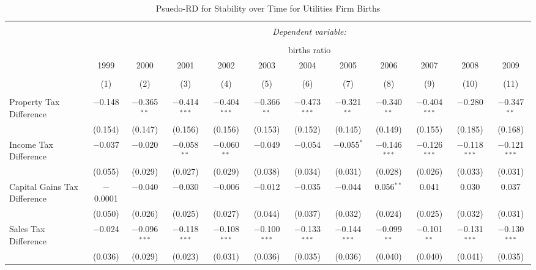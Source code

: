 
\begin{table}[!htbp] \centering 
  \caption{Psuedo-RD for Stability over Time for  Utilities Firm Births} 
  \label{} 
\begin{tabular}{@{\extracolsep{5pt}}lccccccccccc} 
\\[-1.8ex]\hline 
\hline \\[-1.8ex] 
 & \multicolumn{11}{c}{\textit{Dependent variable:}} \\ 
\cline{2-12} 
\\[-1.8ex] & \multicolumn{11}{c}{births ratio} \\ 
 & 1999 & 2000 & 2001 & 2002 & 2003 & 2004 & 2005 & 2006 & 2007 & 2008 & 2009 \\ 
\\[-1.8ex] & (1) & (2) & (3) & (4) & (5) & (6) & (7) & (8) & (9) & (10) & (11)\\ 
\hline \\[-1.8ex] 
 Property Tax Difference & $-$0.148 & $-$0.365$^{**}$ & $-$0.414$^{***}$ & $-$0.404$^{***}$ & $-$0.366$^{**}$ & $-$0.473$^{***}$ & $-$0.321$^{**}$ & $-$0.340$^{**}$ & $-$0.404$^{***}$ & $-$0.280 & $-$0.347$^{**}$ \\ 
  & (0.154) & (0.147) & (0.156) & (0.156) & (0.153) & (0.152) & (0.145) & (0.149) & (0.155) & (0.185) & (0.168) \\ 
  Income Tax Difference & $-$0.037 & $-$0.020 & $-$0.058$^{**}$ & $-$0.060$^{**}$ & $-$0.049 & $-$0.054 & $-$0.055$^{*}$ & $-$0.146$^{***}$ & $-$0.126$^{***}$ & $-$0.118$^{***}$ & $-$0.121$^{***}$ \\ 
  & (0.055) & (0.029) & (0.027) & (0.029) & (0.038) & (0.034) & (0.031) & (0.028) & (0.026) & (0.033) & (0.031) \\ 
  Capital Gains Tax Difference & $-$0.0001 & $-$0.040 & $-$0.030 & $-$0.006 & $-$0.012 & $-$0.035 & $-$0.044 & 0.056$^{**}$ & 0.041 & 0.030 & 0.037 \\ 
  & (0.050) & (0.026) & (0.025) & (0.027) & (0.044) & (0.037) & (0.032) & (0.024) & (0.025) & (0.032) & (0.031) \\ 
  Sales Tax Difference & $-$0.024 & $-$0.096$^{***}$ & $-$0.118$^{***}$ & $-$0.108$^{***}$ & $-$0.100$^{***}$ & $-$0.133$^{***}$ & $-$0.144$^{***}$ & $-$0.099$^{**}$ & $-$0.101$^{**}$ & $-$0.131$^{***}$ & $-$0.130$^{***}$ \\ 
  & (0.036) & (0.029) & (0.023) & (0.031) & (0.036) & (0.035) & (0.036) & (0.040) & (0.040) & (0.041) & (0.035) \\ 

\end{tabular}
\end{table}
